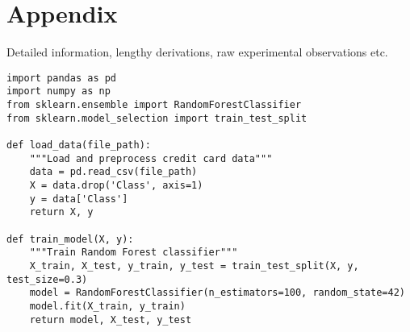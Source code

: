 \appendix
\chapter{Appendix}
Detailed information, lengthy derivations, raw experimental observations etc.

\begin{lstlisting}[caption={Random Forest training code}]
import pandas as pd
import numpy as np
from sklearn.ensemble import RandomForestClassifier
from sklearn.model_selection import train_test_split

def load_data(file_path):
	"""Load and preprocess credit card data"""
	data = pd.read_csv(file_path)
	X = data.drop('Class', axis=1)
	y = data['Class']
	return X, y

def train_model(X, y):
	"""Train Random Forest classifier"""
	X_train, X_test, y_train, y_test = train_test_split(X, y, test_size=0.3)
	model = RandomForestClassifier(n_estimators=100, random_state=42)
	model.fit(X_train, y_train)
	return model, X_test, y_test
\end{lstlisting}
